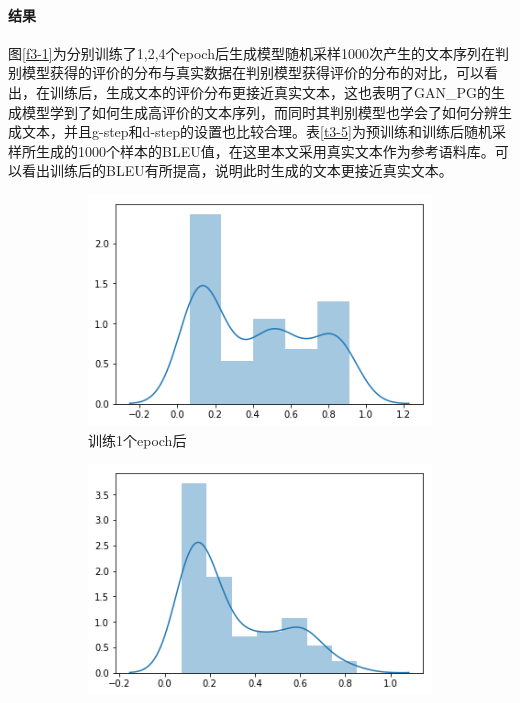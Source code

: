 \paragraph{结果}
图\ref{f3-1}为分别训练了1,2,4个epoch后生成模型随机采样1000次产生的文本序列在判别模型获得的评价的分布与真实数据在判别模型获得评价的分布的对比，可以看出，在训练后，生成文本的评价分布更接近真实文本，这也表明了GAN\_PG的生成模型学到了如何生成高评价的文本序列，而同时其判别模型也学会了如何分辨生成文本，并且g-step和d-step的设置也比较合理。表\ref{t3-5}为预训练和训练后随机采样所生成的1000个样本的BLEU值，在这里本文采用真实文本作为参考语料库。可以看出训练后的BLEU有所提高，说明此时生成的文本更接近真实文本。
\begin{figure}[htb]
    \centering
	\begin{subfigure}{.4\textwidth}
		\includegraphics[width=\textwidth]{0.png}
		\caption{训练1个epoch后}
	\end{subfigure}
	\begin{subfigure}{.4\textwidth}
		\includegraphics[width=\textwidth]{1.png}

\end{subfigure}
\end{figure}
